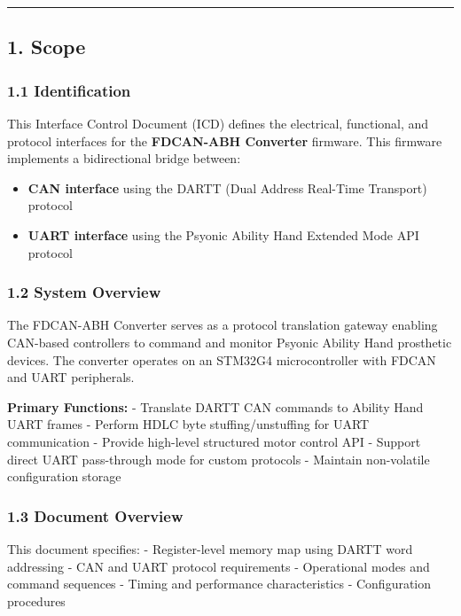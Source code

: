 \documentclass[
  11pt,
]{article}
\providecommand{\tightlist}{%
  \setlength{\itemsep}{0pt}\setlength{\parskip}{0pt}}
\begin{document}
\begin{center}\rule{0.5\linewidth}{0.5pt}\end{center}

\subsection{1. Scope}\label{scope}

\subsubsection{1.1 Identification}\label{identification}

This Interface Control Document (ICD) defines the electrical,
functional, and protocol interfaces for the \textbf{FDCAN-ABH Converter}
firmware. This firmware implements a bidirectional bridge between:

\begin{itemize}
\tightlist
\item
  \textbf{CAN interface} using the DARTT (Dual Address Real-Time
  Transport) protocol
\item
  \textbf{UART interface} using the Psyonic Ability Hand Extended Mode
  API protocol
\end{itemize}

\subsubsection{1.2 System Overview}\label{system-overview}

The FDCAN-ABH Converter serves as a protocol translation gateway
enabling CAN-based controllers to command and monitor Psyonic Ability
Hand prosthetic devices. The converter operates on an STM32G4
microcontroller with FDCAN and UART peripherals.

\textbf{Primary Functions:} - Translate DARTT CAN commands to Ability
Hand UART frames - Perform HDLC byte stuffing/unstuffing for UART
communication - Provide high-level structured motor control API -
Support direct UART pass-through mode for custom protocols - Maintain
non-volatile configuration storage

\subsubsection{1.3 Document Overview}\label{document-overview}

This document specifies: - Register-level memory map using DARTT word
addressing - CAN and UART protocol requirements - Operational modes and
command sequences - Timing and performance characteristics -
Configuration procedures
\end{document}
